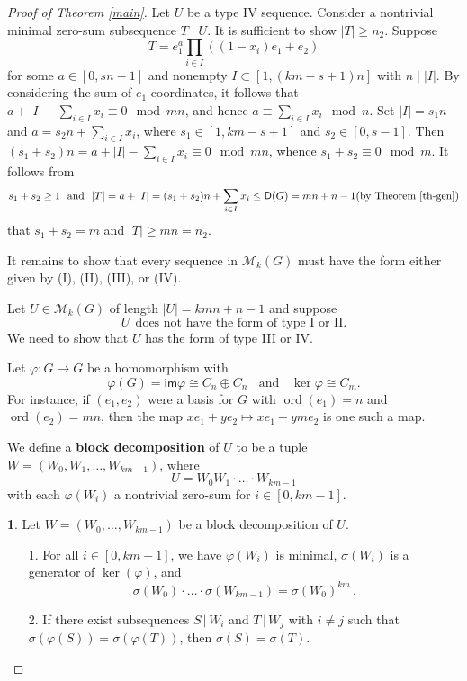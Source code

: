 \documentclass[11pt]{amsart}
\theoremstyle{definition}
\newtheorem{claim}{}[theorem]
\DeclareMathOperator{\ord}{ord}
\newcommand{\und}{\;\mbox{ and }\;}
\renewcommand{\t}{\, | \,}
\numberwithin{equation}{section}
\begin{document}
\begin{proof}[Proof of Theorem \ref{main}]
	Let $U$ be a type IV sequence. Consider a nontrivial minimal zero-sum subsequence $T\mid U$. It is sufficient to show $|T|\ge n_2$.
	 Suppose $$T=e_1^a \prod_{i\in I}((1-x_i)e_1+e_2)$$ for some $a\in [0,sn-1]$ and nonempty $I\subset [1,(km-s+1)n]$  with $n\mid |I|$. 
	By considering the sum of $e_1$-coordinates, it follows that $a+|I|-\sum_{i\in I}x_i\equiv 0\mod mn$, and hence $a\equiv \sum_{i\in I}x_i \mod n$. Set $|I|=s_1n$ and $a=s_2n+\sum_{i\in I}x_i$, where $s_1\in [1, km-s+1]$ and $s_2\in [0, s-1]$.
	Then $(s_1+s_2)n=a+|I|-\sum_{i\in I}x_i\equiv 0\mod mn$, whence $s_1+s_2\equiv 0 \mod m$. 
	It follows from $$ s_1+s_2\ge 1\ \text{ and }\ |T|=a+|I|=(s_1+s_2)n+\sum_{i\in I}x_i\le \mathsf D(G)=mn+n-1 \text{(by Theorem \ref{th-gen})}$$ that $s_1+s_2=m$ and $|T|\ge mn=n_2$.
	

	
		\bigskip
	It remains to show that every sequence in $\mathcal M_k(G)$ must have the form either given by (I), (II), (III), or (IV).
	
	
	\bigskip
	
	Let $U\in \mathcal M_k(G)$  of length $|U|=kmn+n-1$
	and suppose 
	\begin{equation}\label{assume}
		U\ \  \text{does not have the form of type I  or II.}
		\end{equation}
	We need to show that $U$ has the form of type III or IV.
	
	Let
	$\varphi:G\rightarrow G$ be a homomorphism with
	$$\varphi(G)=\mathsf {im} \varphi \cong C_n\oplus C_n\;\und\; \ker \varphi\cong C_m.$$ For instance, if $(e_1,e_2)$ were a basis for $G$ with $\ord(e_1)=n$ and $\ord(e_2)=mn$, then the map $xe_1+ye_2\mapsto xe_1+yme_2$ is one such a map.
	
	We define a \textbf{block decomposition}
	 of $U$ to be
	a tuple $W=(W_0,W_1,\ldots,W_{km-1})$, where
	$$U=W_0
	W_1 \cdot \ldots\cdot W_{km-1}$$ with each $\varphi(W_i)$ a nontrivial zero-sum for $i\in [0,km-1]$.
	
		\begin{claim}\label{sch-A1}
		Let $W=(W_0,\ldots, W_{km-1})$ be a block decomposition of $U$. 
		\begin{enumerate}
			\item[1.] For all $i\in [0,  km-1]$, we have $\varphi(W_i)$ is minimal, $\sigma(W_i)$ is a generator of $\ker(\varphi)$, and 
			$$\sigma(W_0)\cdot\ldots\cdot \sigma(W_{km-1})=\sigma(W_0)^{km}\,.$$
			
			\item[2.] If there exist subsequences $S\t W_i$ and $T\t W_j$ with $i\neq j$ such that $\sigma(\varphi(S))=\sigma(\varphi(T))$, then $\sigma(S)=\sigma(T)$.
			

\end{enumerate}
\end{claim}
\end{proof}
\end{document}
